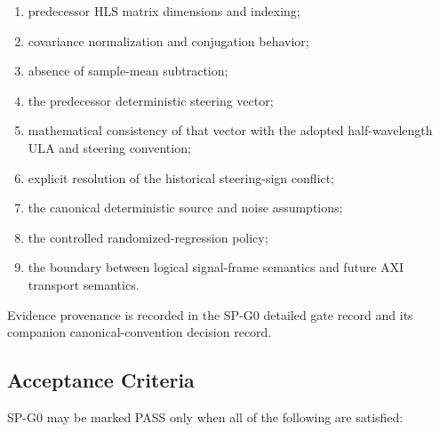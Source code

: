 \begin{enumerate}
    \item predecessor HLS matrix dimensions and indexing;

    \item covariance normalization and conjugation behavior;

    \item absence of sample-mean subtraction;

    \item the predecessor deterministic steering vector;

    \item mathematical consistency of that vector with the adopted
    half-wavelength ULA and steering convention;

    \item explicit resolution of the historical steering-sign conflict;

    \item the canonical deterministic source and noise assumptions;

    \item the controlled randomized-regression policy;

    \item the boundary between logical signal-frame semantics and future AXI
    transport semantics.
\end{enumerate}

Evidence provenance is recorded in the SP-G0 detailed gate record and its
companion canonical-convention decision record.

\subsection{Acceptance Criteria}

SP-G0 may be marked PASS only when all of the following are satisfied:

